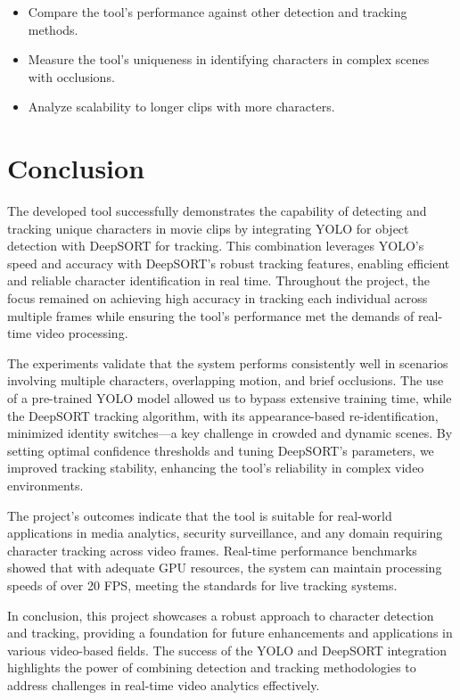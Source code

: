 \documentclass[twoside,english]{article}
\begin{document}
    \begin{itemize}
        \item Compare the tool's performance against other detection and tracking methods.
        \item Measure the tool’s uniqueness in identifying characters in complex scenes with occlusions.
        \item Analyze scalability to longer clips with more characters.
    \end{itemize}


\section{Conclusion} \label{sec:conclusion}


    The developed tool successfully demonstrates the capability of detecting and tracking unique characters in movie clips by integrating YOLO for object detection with DeepSORT for tracking. This combination leverages YOLO's speed and accuracy with DeepSORT's robust tracking features, enabling efficient and reliable character identification in real time. Throughout the project, the focus remained on achieving high accuracy in tracking each individual across multiple frames while ensuring the tool's performance met the demands of real-time video processing.
    
    The experiments validate that the system performs consistently well in scenarios involving multiple characters, overlapping motion, and brief occlusions. The use of a pre-trained YOLO model allowed us to bypass extensive training time, while the DeepSORT tracking algorithm, with its appearance-based re-identification, minimized identity switches—a key challenge in crowded and dynamic scenes. By setting optimal confidence thresholds and tuning DeepSORT’s parameters, we improved tracking stability, enhancing the tool's reliability in complex video environments.
    
    The project’s outcomes indicate that the tool is suitable for real-world applications in media analytics, security surveillance, and any domain requiring character tracking across video frames. Real-time performance benchmarks showed that with adequate GPU resources, the system can maintain processing speeds of over 20 FPS, meeting the standards for live tracking systems.

    In conclusion, this project showcases a robust approach to character detection and tracking, providing a foundation for future enhancements and applications in various video-based fields. The success of the YOLO and DeepSORT integration highlights the power of combining detection and tracking methodologies to address challenges in real-time video analytics effectively.


\end{document}
